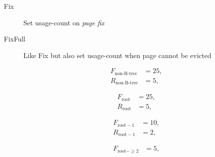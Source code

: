 \begin{frame}
    \begin{description}
        \item[Fix]          Set usage-count on \emph{page fix}
        \item[FixFull]      Like \textcolor{structure}{Fix} but also set usage-count when page cannot be evicted
    \end{description}
    \vspace{.5em}
    \begin{description}
        \item[]     \noindent\begin{minipage}[t]{.225\linewidth}
                        \vspace{-2em}
                        \begin{align*}
                            F_{\text{non-B-tree}} &= 25,\\
                            R_{\text{non-B-tree}} &= 5,
                        \end{align*}
                    \end{minipage}%
                    \noindent\begin{minipage}[t]{.225\linewidth}
                        \vspace{-2em}
                        \begin{align*}
                            F_{\text{root}} &= 25,\\
                            R_{\text{root}} &= 5,
                        \end{align*}\break
                    \end{minipage}%
                    \noindent\begin{minipage}[t]{.225\linewidth}
                        \vspace{-2em}
                        \begin{align*}
                            F_{\text{root} - 1} &= 10,\\
                            R_{\text{root} - 1} &= 2,
                        \end{align*}\break
                    \end{minipage}%
                    \noindent\begin{minipage}[t]{.225\linewidth}
                        \vspace{-2em}
                        \begin{align*}
                            F_{\text{root} - \geq 2} &= 5,\\

\end{align*}
\end{minipage}
\end{description}
\end{frame}
